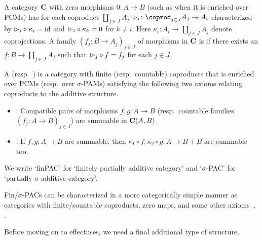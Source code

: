 \documentclass[%
	submission,
copyright,creativecommons,UKenglish]{eptcs}
\begin{document}
\begin{definition}
A category $\mathbf{C}$ with zero morphisms $0\colon A\to B$
(such as when it is enriched over PCMs) has for
each coproduct $\coprod_{j\in J} A_j$
$\pproj_i\colon \coprod_{j\in J} A_j\to A_i$
characterized by $\mathord{\vartriangleright}_i\circ \kappa_i=\mathrm{id}$
and $\mathord{\vartriangleright}_i\circ \kappa_k=0$ for $k\neq i$.
Here $\kappa_i\colon A_i\to \coprod_{j\in J} A_j$
denote coprojections.
A family $(f_j\colon B\to A_j)_{j\in J}$ of morphisms
in $\mathbf{C}$ is  if there exists an
$f\colon B\to \coprod_{j\in J} A_j$ such that
$\mathord{\vartriangleright}_j\circ f= f_j$ for each $j\in J$.
\end{definition}


\begin{definition}
\label{def:sigma-pac}
A 
(resp.\ )
is a category with finite (resp.\ countable) coproducts 
that is enriched over PCMs
(resp.\ over $\sigma$-PAMs)
satisfying the following two axioms
relating coproducts to the additive structure.
\begin{itemize}
\item {}:
Compatible pairs of morphisms $f,g\colon A\to B$
(resp.\ countable families $(f_j\colon A\to B)_{j\in J}$)
are summable in $\mathbf{C}(A,B)$.
\item {}:
If $f,g\colon A\to B$ are summable,
then $\kappa_1\circ f,\kappa_2\circ g\colon A\to B+B$
are summable too.
\end{itemize}
We write `finPAC' for `finitely partially additive category' and `$\sigma$-PAC' for `partially $\sigma$-additive category'.
\end{definition}
\begin{remark}
  Fin/$\sigma$-PACs can be characterized in a more categorically simple manner as categories with finite/countable coproducts, zero maps, and some other axioms~\cite[\S\,3.8.1]{Cho2019PhD}, \cite[\S\,5]{ArbibM1980}.
\end{remark}
Before moving on to effectuses, we need a final additional type of structure.
\end{document}
